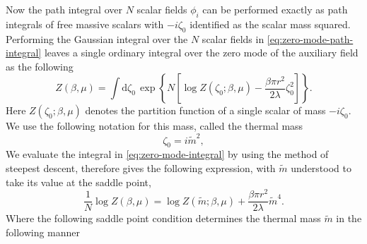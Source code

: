 \documentclass[a4paper,11pt]{article}
\newcommand{\dd}{\mathrm d}
\begin{document}
Now the path integral over $N$ scalar fields $\phi_i$ can be performed exactly as path integrals of free massive scalars with $-i\zeta_0$ identified as the  scalar mass squared.
Performing the Gaussian integral over the $N$ scalar fields in
\eqref{eq:zero-mode-path-integral} leaves a single ordinary integral over
the  zero mode of the auxiliary field as the following
\begin{equation}
 Z(\beta,\mu)
 =\int\dd\zeta_0\,
 \exp\!\left\{N\left[
  \log Z(\zeta_0;\beta,\mu)
  -\frac{\beta\pi r^2}{2\lambda}\zeta_0^2
 \right]\right\}.
 \label{eq:zero-mode-integral}
\end{equation}
Here $ Z(\zeta_0;\beta,\mu)$ denotes the partition function  of a single 
scalar of mass $-i\zeta_0$. We use the following notation for this mass, called the thermal mass
\begin{equation}
 \zeta_{0}=i\tilde m^2,
 \label{eq:thermal-mass-definition}
\end{equation}
We evaluate the integral in \eqref{eq:zero-mode-integral} by using the method of steepest
descent, therefore gives the following expression, with $\tilde m$ understood
to take its value at the saddle point,
\begin{equation}
 \frac1N\log Z(\beta,\mu)
 =\log Z(\tilde m;\beta,\mu)
 +\frac{\beta\pi r^2}{2\lambda}\tilde m^4
 .
 \label{eq:ON-leading-effective-action}
\end{equation}
Where the following saddle point condition determines the thermal mass $\tilde m$ in the following manner
\end{document}
